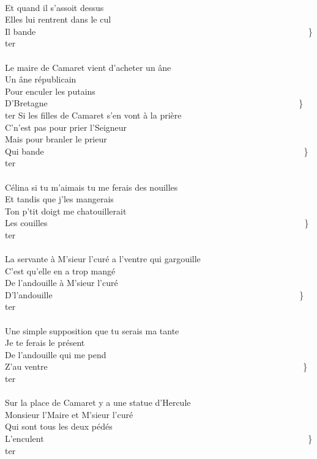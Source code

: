 \\Et quand il s'assoit dessus
\\Elles lui rentrent dans le cul
\\Il bande ~~~~~~~~~~~~~~~~~~~~~~~~~~~~~~~~~~~~~~~~~~~~~~~~~~~~~~~~~~~~~~~\} ter
\\\\Le maire de Camaret vient d'acheter un âne   ~~~~~~~~~~~~~~~\bissimple
\\Un âne républicain
\\Pour enculer les putains
\\D'Bretagne ~~~~~~~~~~~~~~~~~~~~~~~~~~~~~~~~~~~~~~~~~~~~~~~~~~~~~~~~~~\} ter
\breakpage
Si les filles de Camaret s'en vont à la prière   ~~~~~~~~~~~~~~~~\bissimple
\\C'n'est pas pour prier l'Seigneur
\\Mais pour branler le prieur
\\Qui bande ~~~~~~~~~~~~~~~~~~~~~~~~~~~~~~~~~~~~~~~~~~~~~~~~~~~~~~~~~~~~\} ter
\\\\Célina si tu m'aimais tu me ferais des nouilles  ~~~~~~~~~~~~~\bissimple
\\Et tandis que j'les mangerais
\\Ton p'tit doigt me chatouillerait
\\Les couilles~~~~~~~~~~~~~~~~~~~~~~~~~~~~~~~~~~~~~~~~~~~~~~~~~~~~~~~~~~~~\} ter
\\\\La servante à M'sieur l'curé a l'ventre qui gargouille   ~~~~~\bissimple
\\C'est qu'elle en a trop mangé
\\De l'andouille à M'sieur l'curé
\\D'l'andouille ~~~~~~~~~~~~~~~~~~~~~~~~~~~~~~~~~~~~~~~~~~~~~~~~~~~~~~~~~\} ter
\\\\Une simple supposition que tu serais ma tante   ~~~~~~~~~~~~~\bissimple
\\Je te ferais le présent
\\De l'andouille qui me pend
\\Z'au ventre ~~~~~~~~~~~~~~~~~~~~~~~~~~~~~~~~~~~~~~~~~~~~~~~~~~~~~~~~~~~\} ter
\\\\Sur la place de Camaret y a une statue d'Hercule   ~~~~~~~~~\bissimple
\\Monsieur l'Maire et M'sieur l'curé
\\Qui sont tous les deux pédés
\\L'enculent ~~~~~~~~~~~~~~~~~~~~~~~~~~~~~~~~~~~~~~~~~~~~~~~~~~~~~~~~~~~~~\} ter
\\\\
\\
\breakpage